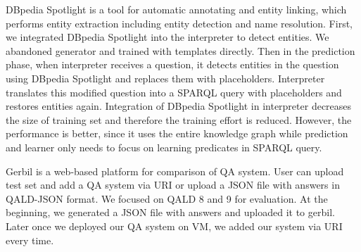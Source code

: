 DBpedia Spotlight \cite{isem2013daiber} is a tool for automatic annotating and entity linking, 
which performs entity extraction including entity detection and name resolution. 
First, we integrated DBpedia Spotlight into the interpreter to detect entities. 
We abandoned generator and trained with templates directly. 
Then in the prediction phase, 
when interpreter receives a question, 
it detects entities in the question using DBpedia Spotlight and replaces them with placeholders.
Interpreter translates this modified question into a SPARQL query with placeholders
and restores entities again. 
Integration of DBpedia Spotlight in interpreter decreases the size of training set
and therefore the training effort is reduced. 
However, the performance is better,
since it uses the entire knowledge graph while prediction
and learner only needs to focus on learning predicates in SPARQL query. 


Gerbil \cite{gerbil} is a web-based platform for comparison of QA system. 
User can upload test set and add a QA system via URI or upload a JSON file with answers in QALD-JSON format. 
We focused on QALD 8 and 9 for evaluation. 
At the beginning, we generated a JSON file with answers and uploaded it to gerbil. 
Later once we deployed our QA system on VM, we added our system via URI every time. 

